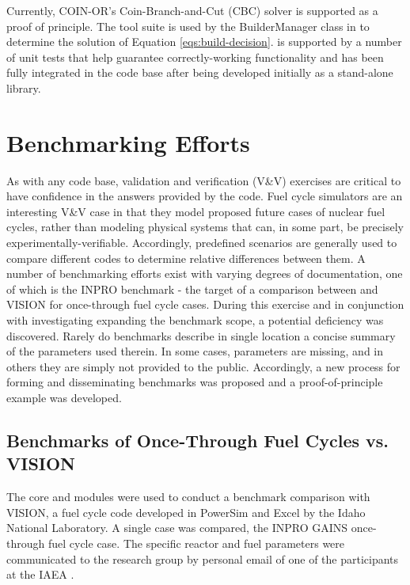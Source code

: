 Currently, COIN-OR's Coin-Branch-and-Cut (CBC) \cite{lougee_common_2003} solver
is supported as a proof of principle. The \Cyclopts tool suite is used by the
BuilderManager class in \Cyclus to determine the solution of Equation
\ref{eqs:build-decision}. \Cyclopts is supported by a number of unit tests that
help guarantee correctly-working functionality and has been fully integrated in
the \Cyclus code base after being developed initially as a stand-alone library.

\section{Benchmarking Efforts}\label{sec:prev-benchmark}

As with any code base, validation and verification (V\&V) exercises are critical
to have confidence in the answers provided by the code. Fuel cycle simulators
are an interesting V\&V case in that they model proposed future cases of nuclear
fuel cycles, rather than modeling physical systems that can, in some part, be
precisely experimentally-verifiable. Accordingly, predefined scenarios are
generally used to compare different codes to determine relative differences
between them. A number of benchmarking efforts exist with varying degrees of
documentation, one of which is the INPRO benchmark - the target of a comparison
between \Cyclus and VISION for once-through fuel cycle cases. During this
exercise and in conjunction with investigating expanding the benchmark scope, a
potential deficiency was discovered. Rarely do benchmarks describe in single
location a concise summary of the parameters used therein. In some cases,
parameters are missing, and in others they are simply not provided to the
public. Accordingly, a new process for forming and disseminating benchmarks was
proposed and a proof-of-principle example was developed.

\subsection{Benchmarks of Once-Through Fuel Cycles vs. VISION}

The \Cyclus core and \Cycamore modules were used to conduct a benchmark
comparison with VISION, a fuel cycle code developed in PowerSim and Excel by the
Idaho National Laboratory. A single case was compared, the INPRO GAINS
\cite{_international_2009} once-through fuel cycle case. The specific reactor
and fuel parameters were communicated to the research group by personal email of
one of the participants at the IAEA \cite{dixon_re:_2009}.


